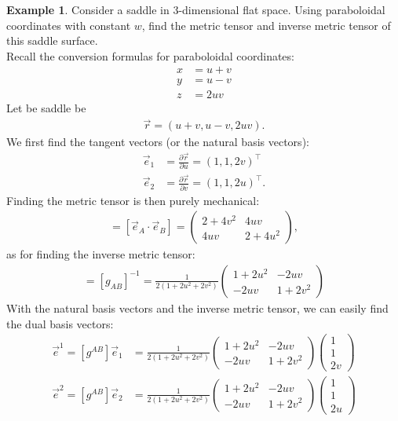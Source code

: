 \documentclass{article}
\theoremstyle{definition}
\newtheorem{exmp}{Example}[section]
\begin{document}
\begin{exmp}
	Consider a saddle in 3-dimensional flat space. Using paraboloidal coordinates with constant $w$, find the metric tensor and inverse metric tensor of this saddle surface.\\
	
	Recall the conversion formulas for paraboloidal coordinates:
	\begin{align*}
	x &= u+v\\
	y &= u-v\\
	z &= 2uv
	\end{align*}
	Let be saddle be
	\begin{align*}
	\vec{r} = (u+v, u-v, 2uv).
	\end{align*}
	We first find the tangent vectors (or the natural basis vectors):
	\begin{align*}
	\vec{e}_1 &= \frac{\partial \vec{r}}{\partial u} = (1,1,2v)^\top\\
	\vec{e}_2 &= \frac{\partial \vec{r}}{\partial v} = (1,1,2u)^\top.
	\end{align*}
	Finding the metric tensor is then purely mechanical:
	\begin{align*}
	[g_{AB}] = [\vec{e}_A\cdot\vec{e}_B] = 
	\begin{pmatrix}
	2 + 4v^2 & 4uv\\
	4uv & 2+4u^2
	\end{pmatrix},
	\end{align*}
	as for finding the inverse metric tensor:
	\begin{align*}
	[g^{AB}] = [g_{AB}]^{-1} = 
	\frac{1}{2(1+2u^2+2v^2)}
	\begin{pmatrix}
	1 + 2u^2 & -2uv\\
	-2uv & 1+2v^2
	\end{pmatrix}
	\end{align*}
	With the natural basis vectors and the inverse metric tensor, we can easily find the dual basis vectors:
	\begin{align*}
	\vec{e}^1 = [g^{AB}]\vec{e}_1 &= 
	\frac{1}{2(1+2u^2+2v^2)}
	\begin{pmatrix}
	1 + 2u^2 & -2uv\\
	-2uv & 1+2v^2
	\end{pmatrix}
	\begin{pmatrix}
	1 \\ 1 \\ 2v
	\end{pmatrix}\\
	\vec{e}^2 = [g^{AB}]\vec{e}_2 &= 
	\frac{1}{2(1+2u^2+2v^2)}
	\begin{pmatrix}
	1 + 2u^2 & -2uv\\
	-2uv & 1+2v^2
	\end{pmatrix}
	\begin{pmatrix}
	1 \\ 1 \\ 2u
	\end{pmatrix}
	\end{align*}
\end{exmp}
\end{document}
